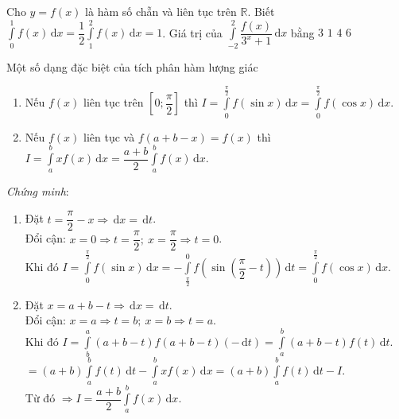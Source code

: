 \begin{vd}%
	Cho $y=f(x)$ là hàm số chẵn và liên tục trên $\mathbb{R}$. Biết $\displaystyle\int\limits_0^1 f(x) \mathrm{\,d}x=\dfrac{1}{2}\displaystyle\int\limits_1^2 f(x) \mathrm{\,d}x=1$. Giá trị của $\displaystyle\int\limits_{-2}^2 \dfrac{f(x)}{3^x+1} \mathrm{\,d}x$ bằng
	\choice
	{\True $3$}
	{$1$}
	{$4$}
	{$6$}
\end{vd}

\begin{dang}{Một số dạng đặc biệt của tích phân hàm lượng giác}
\begin{enumerate}
\item Nếu $f(x)$ liên tục trên $\left[0;\dfrac{\pi}{2}\right]$ thì $I=\displaystyle\int\limits_{0}^{\frac{\pi}{2}}f(\sin x)\mathrm{\,d}x=\displaystyle\int\limits_{0}^{\frac{\pi}{2}}f(\cos x)\mathrm{\,d}x$.
\item Nếu $f(x)$ liên tục và $f\left(a+b-x\right)=f(x)$ thì $I=\displaystyle\int\limits_{a}^{b}xf(x)\mathrm{\,d}x=\dfrac{a+b}{2}\displaystyle\int\limits_{a}^{b}f(x)\mathrm{\,d}x$.
\end{enumerate}
\end{dang}
\noindent
\emph{Chứng minh}:
\begin{enumerate}
\item Đặt $t=\dfrac{\pi}{2}-x\Rightarrow \mathrm{\,d}x=\mathrm{\,d}t$.\\
		Đổi cận: $x=0\Rightarrow t=\dfrac{\pi}{2};\ x=\dfrac{\pi}{2}\Rightarrow t=0$.\\
		Khi đó $I=\displaystyle\int\limits_{0}^{\frac{\pi}{2}}f(\sin x)\mathrm{\,d}x=-\displaystyle\int\limits_{\frac{\pi}{2}}^{0}f\left(\sin \left(\dfrac{\pi}{2}-t\right)\right)\mathrm{\,d}t=
		\displaystyle\int\limits_{0}^{\frac{\pi}{2}}f(\cos x)\mathrm{\,d}x$.
\item Đặt $x=a+b-t\Rightarrow \mathrm{\,d}x=\mathrm{\,d}t$.\\
		Đổi cận: $x=a\Rightarrow t=b;\ x=b\Rightarrow t=a$.\\
		Khi đó $I=\displaystyle\int\limits_{b}^{a}(a+b-t)f\left(a+b-t\right)(-\mathrm{\,d}t)=\displaystyle\int\limits_{a}^{b}(a+b-t)f\left(t\right)\mathrm{\,d}t$.\\
		$=(a+b)\displaystyle\int\limits_{a}^{b}f\left(t\right)\mathrm{\,d}t-\displaystyle\int\limits_{a}^{b}xf\left(x\right)\mathrm{\,d}x=(a+b)\displaystyle\int\limits_{a}^{b}f\left(t\right)\mathrm{\,d}t-I$.\\
		Từ đó $\Rightarrow I=\dfrac{a+b}{2}\displaystyle\int\limits_{a}^{b}f\left(x\right)\mathrm{\,d}x$.
\end{enumerate}
